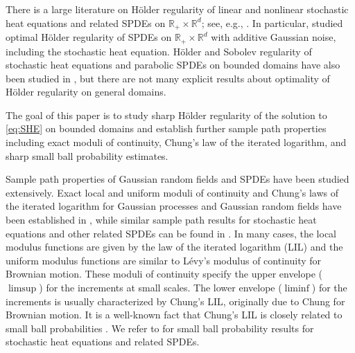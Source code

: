 \documentclass[reqno]{amsart}
\newcommand{\R}{\mathbb R}
\newcommand{\1}{\mathbf 1}
\numberwithin{equation}{section}
\theoremstyle{definition}
\begin{document}
There is a large literature on H\"older regularity of linear and nonlinear stochastic heat equations and related SPDEs on $\R_+ \times \R^d$; see, e.g., \cite{Walsh,CD14,SS00,SS02,BC18,HL19,BJQ16,BQS19,KS23,C17,L17,DS26}.
In particular, \cite{KS23} studied optimal H\"older regularity of SPDEs on $\R_+ \times \R^d$ with additive Gaussian noise, including the stochastic heat equation.
H\"older and Sobolev regularity of stochastic heat equations and parabolic SPDEs on bounded domains have also been studied in \cite{CCV,DKZ,SV,NV09,DPZ,DS26}, but there are not many explicit results about optimality of H\"older regularity on general domains.


The goal of this paper is to study sharp H\"older regularity of the solution to \eqref{eq:SHE} on bounded domains and establish further sample path properties including exact moduli of continuity, Chung's law of the iterated logarithm, and sharp small ball probability estimates.

Sample path properties of Gaussian random fields and SPDEs have been studied extensively. Exact local and uniform moduli of continuity and Chung's laws of the iterated logarithm for Gaussian processes and Gaussian random fields have been established in \cite{MWX13,LX23,LZ26,LX10}, while similar sample path results for stochastic heat equations and other related SPDEs can be found in \cite{FKM15,HSWX20,Chen23,GSWX25,WX24,HL26,LX19,CLX26}.
In many cases, the local modulus functions are given by the law of the iterated logarithm (LIL) and the uniform modulus functions are similar to L\'evy's modulus of continuity for Brownian motion. 
These moduli of continuity specify the upper envelope ($\limsup$) for the increments at small scales.
The lower envelope ($\liminf$) for the increments is usually characterized by Chung's LIL, originally due to Chung \cite{Chung} for Brownian motion.
It is a well-known fact that Chung's LIL is closely related to small ball probabilities \cite{LS01}.
We refer to \cite{AJM21,C24,C25,C26,KKM24,H24,FJK23,HL26} for small ball probability results for stochastic heat equations and related SPDEs.
\end{document}
